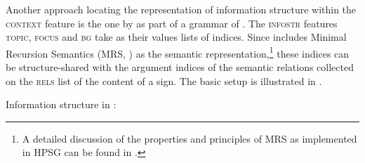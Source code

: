 \documentclass[output=paper
	        ,collection
	        ,collectionchapter
 	        ,biblatex
                ,babelshorthands
                ,newtxmath
                ,draftmode
                ,colorlinks, citecolor=brown
]{langscibook}
\begin{document}
Another approach locating the representation of information structure
within the \textsc{context} feature is the one by
\cite{Paggio2009a-u} as part of a grammar of . The
\textsc{infostr} features \textsc{topic}, \textsc{focus} and
\textsc{bg} take as their values lists of indices. Since
\cite{Paggio2009a-u} includes Minimal Recursion Semantics (MRS,
\citealt{CFPS2005a}) as the semantic representation,\footnote{A detailed
  discussion of the properties and principles of MRS as implemented in
  HPSG can be found in .} these indices
can be structure-shared with the argument indices of the semantic
relations collected on the \textsc{rels} list of the content of a
sign. The basic setup is illustrated in .

\ea\label{fig:paggio-infostr}
Information structure in \cite[149]{Paggio2009a-u}:\\
        \leavevmode
{}
\z
\end{document}
